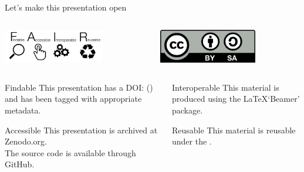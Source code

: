 \begin{frame}{Let's make this presentation open}

	\begin{columns}[t]
		\begin{column}{.45\textwidth}
		  \centering
		  \includegraphics[height=1.5cm]{images/1280px-FAIR_data_principles.jpg}

		\end{column}

		\begin{column}{.45\textwidth}
		    \centering
		    \includegraphics[height=1.5cm]{images/cc-by-sa.png}
    \end{column}
	\end{columns}

	\begin{columns}[t]
		\begin{column}{.45\textwidth}
		    \centering
		    \begin{block}{Findable}
			    This presentation has a DOI: %
			    () %
			    and has been tagged with appropriate metadata.
		    \end{block}

		    \begin{block}{Accessible}
			    This presentation is archived at Zenodo.org. \\
			    The source code is available through GitHub.
		    \end{block}
    \end{column}

		\begin{column}{.45\textwidth}
		  \centering
		  \begin{block}{Interoperable}
			    This material is produced using the \LaTeX\space `Beamer' package.
		  \end{block}

		  \begin{block}{Reusable}
			  This material is reusable under the .
		  \end{block}
    \end{column}
	\end{columns}
\end{frame}